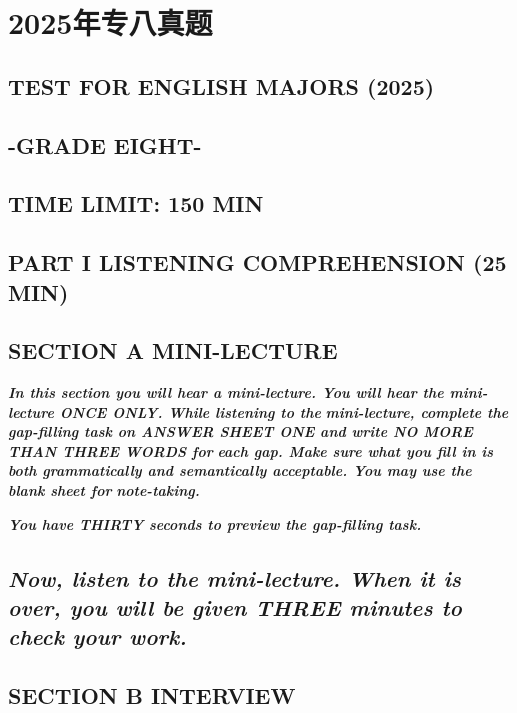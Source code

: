 \documentclass[UTF8,11pt]{ctexart}
\begin{document}
\section*{2025年专八真题}
\subsection*{\textbf{TEST} \textbf{FOR} \textbf{ENGLISH} \textbf{MAJORS (2025)}}


\subsection*{\textbf{-GRADE EIGHT-}}


\subsection*{\textbf{TIME LIMIT: 150 MIN}}


\subsection*{\textbf{PART I} \textbf{LISTENING COMPREHENSION} \textbf{(25 MIN})}


\subsection*{\textbf{SECTION A MINI-LECTURE}}


\textbf{\textit{In this section you will hear a mini-lecture. You will hear the mini-lecture ONCE ONLY. While listening to the}} \textbf{\textit{mini-lecture, complete the gap-filling task on ANSWER SHEET ONE and write NO MORE THAN THREE WORDS for}} \textbf{\textit{each gap. Make sure what you fill in is both grammatically and semantically acceptable. You may use the blank sheet for}} \textbf{\textit{note-taking.}}


\textbf{\textit{You have THIRTY seconds to preview the gap-filling task.}}


\subsection*{\textbf{\textit{Now, listen to the mini-lecture. When it is over, you will be given THREE minutes to check your work.}}}


\subsection*{\textbf{SECTION B INTERVIEW}}
\end{document}
